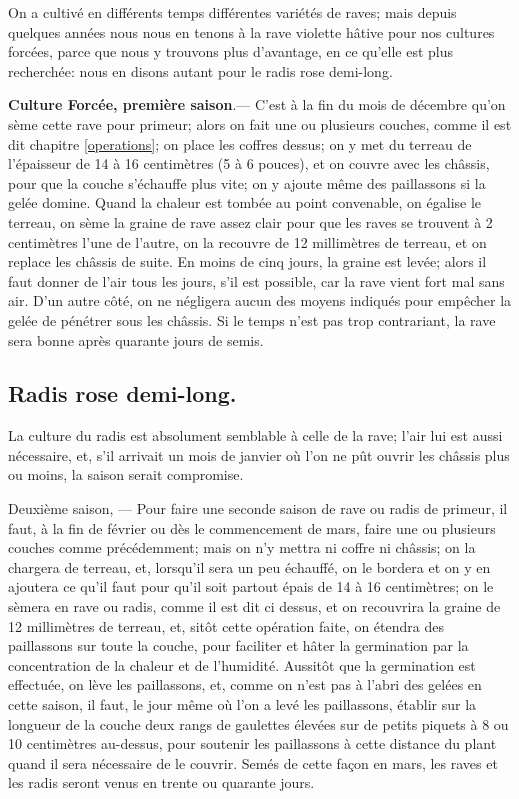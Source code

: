\documentclass[10pt,a4paper]{book}
\begin{document}
On a cultivé en différents temps différentes variétés de raves; mais depuis quelques années nous nous en tenons à la rave violette hâtive pour nos cultures forcées, parce que nous y trouvons plus d'avantage, en ce qu'elle est plus recherchée: nous en disons autant pour le radis rose demi-long.

\textbf{Culture Forcée, première saison}.--- C'est à la fin du mois de décembre qu'on sème cette rave pour primeur; alors on fait une ou plusieurs couches, comme il est dit chapitre \ref{operations}; on place les coffres dessus; on y met du terreau de l'épaisseur de 14 à 16 centimètres (5 à 6 pouces), et on couvre avec les châssis, pour que la couche s'échauffe plus vite; on y ajoute même des paillassons si la gelée domine. Quand la chaleur est tombée au point convenable, on égalise le terreau, on sème la graine de rave assez clair pour que les raves se trouvent à 2 centimètres l'une de l'autre, on la recouvre de 12 millimètres de terreau, et on replace les châssis de suite. En moins de cinq jours, la graine est levée; alors il faut donner de l'air tous les jours, s'il est possible, car la rave vient fort mal sans air. D'un autre côté, on ne négligera aucun des moyens indiqués pour empêcher la gelée de pénétrer sous les châssis. Si le temps n'est pas trop contrariant, la rave sera bonne après quarante jours de semis.

\subsection{Radis rose demi-long.}

La culture du radis est absolument semblable à celle de la rave; l'air lui est aussi nécessaire, et, s'il arrivait un mois de janvier où l'on ne pût ouvrir les châssis plus ou moins, la saison serait compromise.

Deuxième saison, --- Pour faire une seconde saison de rave ou radis de primeur, il faut, à la fin de février ou dès le commencement de mars, faire une ou plusieurs couches comme précédemment; mais on n'y mettra ni coffre ni châssis; on la chargera de terreau, et, lorsqu'il sera un peu échauffé, on le bordera et on y en ajoutera ce qu'il faut pour qu'il soit partout épais de 14 à 16 centimètres; on le sèmera en rave ou radis, comme il est dit ci dessus, et on recouvrira la graine de 12 millimètres de terreau, et, sitôt cette opération faite, on étendra des paillassons sur toute la couche, pour faciliter et hâter la germination par la concentration de la chaleur et de l'humidité. Aussitôt que la germination est effectuée, on lève les paillassons, et, comme on n'est pas à l'abri des gelées en cette saison, il faut, le jour même où l'on a levé les paillassons, établir sur la longueur de la couche deux rangs de gaulettes élevées sur de petits piquets à 8 ou 10 centimètres au-dessus, pour soutenir les paillassons à cette distance du plant quand il sera nécessaire de le couvrir. Semés de cette façon en mars, les raves et les radis seront venus en trente ou quarante jours.
\end{document}
